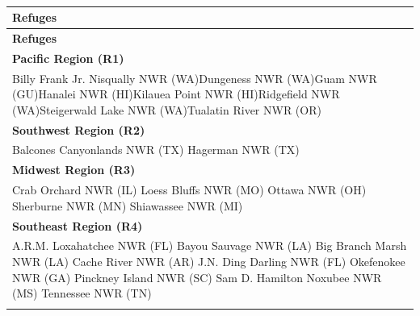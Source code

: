 \documentclass[]{book}
\begin{document}
\begin{longtable}[]{@{}l@{}}
\caption{\label{tab:refuge-list}}\tabularnewline
\toprule
\begin{minipage}[b]{0.05\columnwidth}\raggedright\strut
\textbf{Refuges}\strut
\end{minipage}\tabularnewline
\midrule
\endfirsthead
\toprule
\begin{minipage}[b]{0.05\columnwidth}\raggedright\strut
\textbf{Refuges}\strut
\end{minipage}\tabularnewline
\midrule
\endhead
\begin{minipage}[t]{0.05\columnwidth}\raggedright\strut
\textbf{Pacific Region (R1)}\strut
\end{minipage}\tabularnewline
\begin{minipage}[t]{0.05\columnwidth}\raggedright\strut
Billy Frank Jr. Nisqually NWR (WA)Dungeness NWR (WA)Guam NWR (GU)Hanalei
NWR (HI)Kilauea Point NWR (HI)Ridgefield NWR (WA)Steigerwald Lake NWR
(WA)Tualatin River NWR (OR)\strut
\end{minipage}\tabularnewline
\begin{minipage}[t]{0.05\columnwidth}\raggedright\strut
\textbf{Southwest Region (R2)}\strut
\end{minipage}\tabularnewline
\begin{minipage}[t]{0.05\columnwidth}\raggedright\strut
Balcones Canyonlands NWR (TX) Hagerman NWR (TX)\strut
\end{minipage}\tabularnewline
\begin{minipage}[t]{0.05\columnwidth}\raggedright\strut
\textbf{Midwest Region (R3)}\strut
\end{minipage}\tabularnewline
\begin{minipage}[t]{0.05\columnwidth}\raggedright\strut
Crab Orchard NWR (IL) Loess Bluffs NWR (MO) Ottawa NWR (OH) Sherburne
NWR (MN) Shiawassee NWR (MI)\strut
\end{minipage}\tabularnewline
\begin{minipage}[t]{0.05\columnwidth}\raggedright\strut
\textbf{Southeast Region (R4)}\strut
\end{minipage}\tabularnewline
\begin{minipage}[t]{0.05\columnwidth}\raggedright\strut
A.R.M. Loxahatchee NWR (FL) Bayou Sauvage NWR (LA) Big Branch Marsh NWR
(LA) Cache River NWR (AR) J.N. Ding Darling NWR (FL) Okefenokee NWR (GA)
Pinckney Island NWR (SC) Sam D. Hamilton Noxubee NWR (MS) Tennessee NWR
(TN)\strut
\end{minipage}\tabularnewline
\begin{minipage}[t]{0.05\columnwidth}\raggedright\strut

\end{minipage}
\end{longtable}
\end{document}
